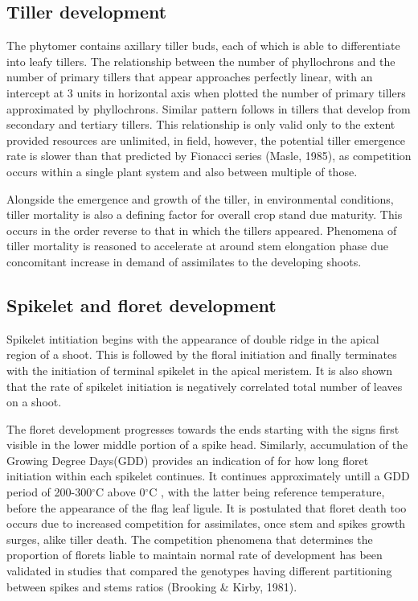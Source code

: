 \documentclass[12pt,oneside]{dukestatscithesis} %
\begin{document}
\hypertarget{tiller-development}{%
\subsection{Tiller development}\label{tiller-development}}

The phytomer contains axillary tiller buds, each of which is able to differentiate into leafy tillers. The relationship between the number of phyllochrons and the number of primary tillers that appear approaches perfectly linear, with an intercept at 3 units in horizontal axis when plotted the number of primary tillers approximated by phyllochrons. Similar pattern follows in tillers that develop from secondary and tertiary tillers. This relationship is only valid only to the extent provided resources are unlimited, in field, however, the potential tiller emergence rate is slower than that predicted by Fionacci series (Masle, 1985), as competition occurs within a single plant system and also between multiple of those.

Alongside the emergence and growth of the tiller, in environmental conditions, tiller mortality is also a defining factor for overall crop stand due maturity. This occurs in the order reverse to that in which the tillers appeared. Phenomena of tiller mortality is reasoned to accelerate at around stem elongation phase due concomitant increase in demand of assimilates to the developing shoots.

\hypertarget{spikelet-and-floret-development}{%
\subsection{Spikelet and floret development}\label{spikelet-and-floret-development}}

Spikelet intitiation begins with the appearance of double ridge in the apical region of a shoot. This is followed by the floral initiation and finally terminates with the initiation of terminal spikelet in the apical meristem. It is also shown that the rate of spikelet initiation is negatively correlated total number of leaves on a shoot.

The floret development progresses towards the ends starting with the signs first visible in the lower middle portion of a spike head. Similarly, accumulation of the Growing Degree Days(GDD) provides an indication of for how long floret initiation within each spikelet continues. It continues approximately untill a GDD period of 200-300\(^\circ\)C above 0\(^\circ\)C , with the latter being reference temperature, before the appearance of the flag leaf ligule. It is postulated that floret death too occurs due to increased competition for assimilates, once stem and spikes growth surges, alike tiller death. The competition phenomena that determines the proportion of florets liable to maintain normal rate of development has been validated in studies that compared the genotypes having different partitioning between spikes and stems ratios (Brooking \& Kirby, 1981).
\end{document}
